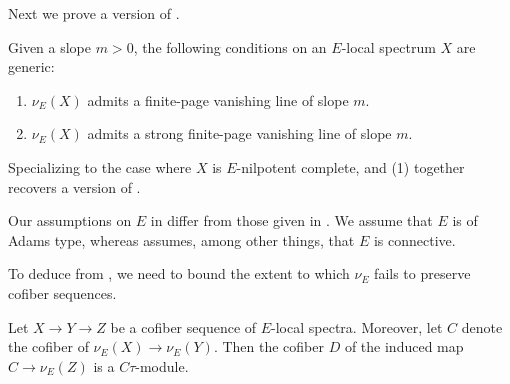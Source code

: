 Next we prove a version of \cite[Theorem 1.3]{HPS}.

\begin{thm}\label{thm:HPS}
  Given a slope $m > 0$, the following conditions on an $E$-local spectrum $X$ are generic:
  \begin{enumerate}
  \item $\nu_E (X)$ admits a finite-page vanishing line of slope $m$.
  \item $\nu_E (X)$ admits a strong finite-page vanishing line of slope $m$.
  \end{enumerate}
\end{thm}

\begin{rmk}
  Specializing to the case where $X$ is $E$-nilpotent complete,  and (1) together recovers a version of \cite[Theorem 1.3 (i)]{HPS}.

  Our assumptions on $E$ in  differ from those given in \cite[Condition 1.2]{HPS}. We assume that $E$ is of Adams type, whereas \cite{HPS} assumes, among other things, that $E$ is connective.
\end{rmk}


To deduce  from , we need to bound the extent to which $\nu_E$ fails to preserve cofiber sequences.

\begin{lem}\label{lemm:comparison-tau-tor}
  Let $X \to Y \to Z$ be a cofiber sequence of $E$-local spectra. Moreover, let $C$ denote the cofiber of $\nu_E (X) \to \nu_E (Y)$. Then the cofiber $D$ of the induced map $C \to \nu_E (Z)$ is a $C\tau$-module.
\end{lem}

